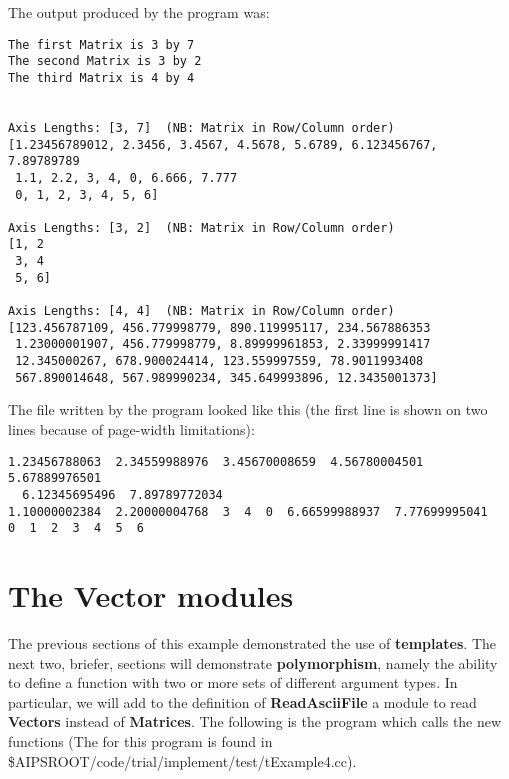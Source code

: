         The output produced by the program was:

\begin{verbatim}
The first Matrix is 3 by 7
The second Matrix is 3 by 2
The third Matrix is 4 by 4


Axis Lengths: [3, 7]  (NB: Matrix in Row/Column order)
[1.23456789012, 2.3456, 3.4567, 4.5678, 5.6789, 6.123456767, 7.89789789
 1.1, 2.2, 3, 4, 0, 6.666, 7.777
 0, 1, 2, 3, 4, 5, 6]

Axis Lengths: [3, 2]  (NB: Matrix in Row/Column order)
[1, 2
 3, 4
 5, 6]

Axis Lengths: [4, 4]  (NB: Matrix in Row/Column order)
[123.456787109, 456.779998779, 890.119995117, 234.567886353
 1.23000001907, 456.779998779, 8.89999961853, 2.33999991417
 12.345000267, 678.900024414, 123.559997559, 78.9011993408
 567.890014648, 567.989990234, 345.649993896, 12.3435001373]
\end{verbatim}


        The file written by the program looked like this (the first line is 
shown on two lines because of page-width limitations):

\begin{verbatim}
1.23456788063  2.34559988976  3.45670008659  4.56780004501  5.67889976501
  6.12345695496  7.89789772034  
1.10000002384  2.20000004768  3  4  0  6.66599988937  7.77699995041  
0  1  2  3  4  5  6  
\end{verbatim}

        

\newpage
\section{The Vector modules}
 
        The previous sections of this example demonstrated the use of
{\bf templates}. The next two, briefer, sections will demonstrate 
{\bf polymorphism}, namely the ability to define a function with two or more
sets of different argument types.  In particular, we will add to the definition
of {\bf ReadAsciiFile} a module to read {\bf Vectors} instead of {\bf Matrices}.
The following is the program which calls the new functions
(The 
for this program is found in 
\$AIPSROOT/code/trial/implement/test/tExample4.cc). 

